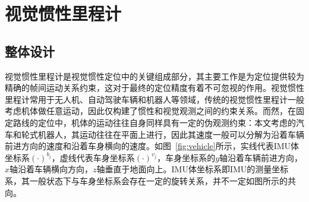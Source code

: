 
\chapter{视觉惯性里程计}

\section{整体设计}
视觉惯性里程计是视觉惯性定位中的关键组成部分，其主要工作是为定位提供较为精确的帧间运动关系约束，这对于最终的定位精度有着不可忽视的作用。视觉惯性里程计常用于无人机、自动驾驶车辆和机器人等领域，传统的视觉惯性里程计一般考虑机体做任意运动，因此仅构建了惯性和视觉观测之间的约束关系。而然，在固定路线的定位中，机体的运动往往自身同样具有一定的伪观测约束：本文考虑的汽车和轮式机器人，其运动往往在平面上进行，因此其速度一般可以分解为沿着车辆前进方向的速度和沿着车身横向的速度。如图~\ref{fig:vehicle}所示，实线代表IMU体坐标系$(\cdot)^{b_{j}}$，虚线代表车身坐标系$(\cdot)^{v_{j}}$，车身坐标系的$y$轴沿着车辆前进方向，$x$轴沿着车辆横向方向，$z$轴垂直于地面向上。IMU体坐标系即IMU的测量坐标系，其一般状态下与车身坐标系会存在一定的旋转关系，并不一定如图所示的共向。


